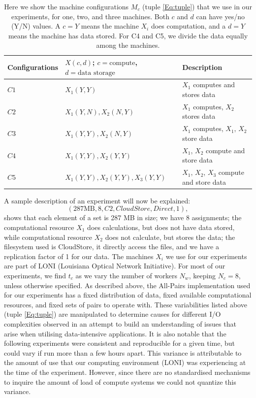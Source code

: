 \documentclass{rspublic}
\begin{document}
\begin{table}
\begin{center}
    \begin{tabular}{ | l | l | l |}
    \hline
    Configurations & $X(c,d)$; $c= \mbox{compute}$, $d=\mbox{data storage}$ & Description  \\ \hline
    $C1$ & $X_1(Y,Y)$  & $X_1$ computes and stores data\\ \hline    
    $C2$ & $X_1(Y,N), X_2(N,Y)$  & $X_1$ computes, $X_2$ stores data \\ \hline
    $C3$ & $X_1(Y,Y), X_2(N,Y)$  & $X_1$ computes, $X_1$, $X_2$ store data \\ \hline
    $C4$ & $X_1(Y,Y), X_2(Y,Y)$  & $X_1$, $X_2$ compute and store data \\ \hline
    $C5$ & $X_1(Y,Y), X_2(Y,Y), X_3(Y,Y)$  & $X_1$, $X_2$, $X_3$ compute and store data \\ 
    \hline
    \end{tabular}
\end{center}
    \caption{Here we show the machine configurations $M_c$ (tuple
\ref{Eq:tuple}) that we use in our experiments, for one, two, and three
machines. Both $c$ and $d$ can have yes/no (Y/N) values. A $c = Y$ means
the machine $X_i$ does computation, and a $d = Y$ means the machine has
data stored. For C4 and C5, we divide the data equally among the
machines.}
    \label{Tab:Configs}
\vspace{-0.5cm}
\end{table}


A sample description of an experiment will now be explained:
 \begin{equation}
(287 \mbox{MB}, 8, C2, CloudStore, Direct, 1),
\end{equation}
shows that each element of a set is 287 MB in size; we have 8
assignments; the computational resource $X_1$ does calculations, but
does not have data stored, while computational resource $X_2$ does not
calculate, but stores the data; the filesystem used is CloudStore, it
directly access the files, and we have a replication factor of 1 for our
data. The machines $X_i$ we use for our experiments are part of LONI
(Louisiana Optical Network Initiative). For most of our experiments, we
find $t_c$ as we vary the number of workers $N_w$, keeping $N_c=8$,
 unless otherwise specified. As described
above, the All-Pairs implementation used for our experiments has a fixed
distribution of data, fixed available computational resources, and fixed
sets of pairs to operate with. These variabilities listed above (tuple
\ref{Eq:tuple}) are manipulated to determine causes for different I/O
complexities observed in an attempt to build an understanding of issues
that arise when utilising data-intensive applications. It is also
notable that the following experiments were consistent and reproducible
for a given time, but could vary if run more than a few hours apart.
This variance is attributable to the amount of use that our computing
environment (LONI) was experiencing at the time of the experiment. However, since 
there are no standardised mechanisms to inquire the amount of load of compute systems we could not quantize this variance.
\end{document}
